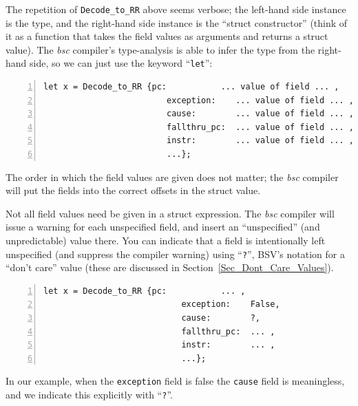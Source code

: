 \vspace{2ex}

The repetition of \verb|Decode_to_RR| above seems verbose; the
left-hand side instance is the type, and the right-hand side instance
is the ``struct constructor'' (think of it as a function that takes
the field values as arguments and returns a struct value). The
\emph{bsc} compiler's type-analysis is able to infer the type from the
right-hand side, so we can just use the keyword ``\verb|let|'':


{\footnotesize
\begin{Verbatim}[frame=single, numbers=left]
   let x = Decode_to_RR {pc:           ... value of field ... ,
                         exception:    ... value of field ... ,
                         cause:        ... value of field ... ,
                         fallthru_pc:  ... value of field ... ,
                         instr:        ... value of field ... ,
                         ...};
\end{Verbatim}
}

The order in which the field values are given does not matter; the
\emph{bsc} compiler will put the fields into the correct offsets in
the struct value.

Not all field values need be given in a struct expression.  The
\emph{bsc} compiler will issue a warning for each unspecified field,
and insert an ``unspecified'' (and unpredictable) value there.  You
can indicate that a field is intentionally left unspecified (and
suppress the compiler warning) using ``\verb|?|'', BSV's notation for
a ``don't care'' value (these are discussed in
Section~\ref{Sec_Dont_Care_Values}).

{\footnotesize
\begin{Verbatim}[frame=single, numbers=left]
      let x = Decode_to_RR {pc:           ... ,
                            exception:    False,
                            cause:        ?,
                            fallthru_pc:  ... ,
                            instr:        ... ,
                            ...};
\end{Verbatim}
}

In our example, when the \verb|exception| field is false the
\verb|cause| field is meaningless, and we indicate this explicitly
with ``\verb|?|''.


